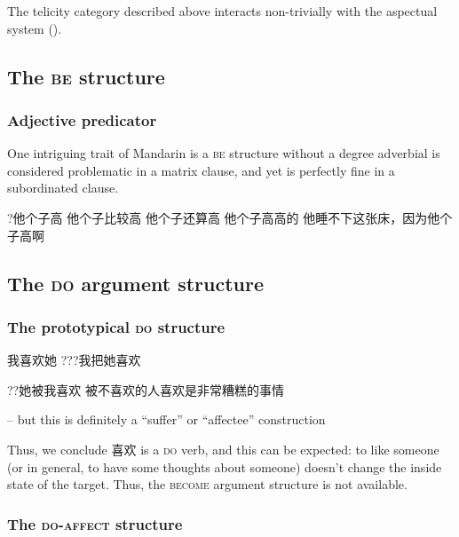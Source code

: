\documentclass[UTF8, a4paper, oneside, scheme=plain, 12pt]{ctexrep}
\newcommand*{\category}[1]{\textsc{#1}}
\begin{document}
The telicity category described above interacts non-trivially with 
the aspectual system ().

\subsection{The \category{be} structure}\label{sec:verb-phrase.be}

\subsubsection{Adjective predicator}

One intriguing trait of Mandarin is a \category{be} structure 
without a degree adverbial is considered problematic
in a matrix clause,
and yet is perfectly fine in a subordinated clause.

\begin{exe}
    \ex ?他个子高
    \ex 他个子比较高
    \ex 他个子还算高
    \ex 他个子高高的
    \ex 他睡不下这张床，因为他个子高啊
\end{exe}

\subsection{The \category{do} argument structure}\label{sec:verb-phrase.do}

\subsubsection{The prototypical \category{do} structure}\label{sec:verb-phrase.do.standard}

\begin{exe}
    \ex 我喜欢她
    \ex ???我把她喜欢
    \begin{xlist}
        \ex ??她被我喜欢
        \ex 被不喜欢的人喜欢是非常糟糕的事情
    \end{xlist}
\end{exe}

 -- but this is definitely a ``suffer'' or ``affectee'' construction

Thus, we conclude 喜欢 is a \category{do} verb, 
and this can be expected: 
to like someone (or in general, to have some thoughts about someone) 
doesn't change the inside state of the target.
Thus, the \category{become} argument structure is not available. 

\subsubsection{The \category{do}-\category{affect} structure}\label{sec:verb-phrase.do.affect}
\end{document}
